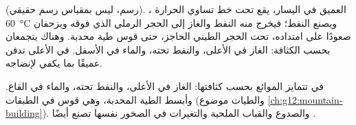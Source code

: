 \begin{omfigure}
{\small {} (رسم، ليس بمقياس رسم حقيقي). ، العميق
في اليسار، يقع تحت خط تساوي الحرارة \qty{60}{\degreeCelsius} ويصنع
النفط؛ فيخرج منه النفط والغاز إلى الحجر الرملي الذي فوقه ويزحفان صعودًا على امتداده،
تحت الحجر الطيني الحاجز، حتى قوس طية محدبة. وهناك يتجمعان
بحسب الكثافة: الغاز في الأعلى، والنفط تحته، والماء في الأسفل. 
في الأعلى تدفن  عميقًا بما يكفي لإنضاجه.}
\end{omfigure}

في  تتمايز الموائع بحسب كثافتها: الغاز في الأعلى، والنفط تحته،
والماء في القاع. وأبسط  الطية المحدبة، وهي قوس في
الطبقات (والطيات موضوع \cref{ch:g12:mountain-building}). والصدوع
والقباب الملحية والتغيرات في الصخور نفسها تصنع أيضًا .

